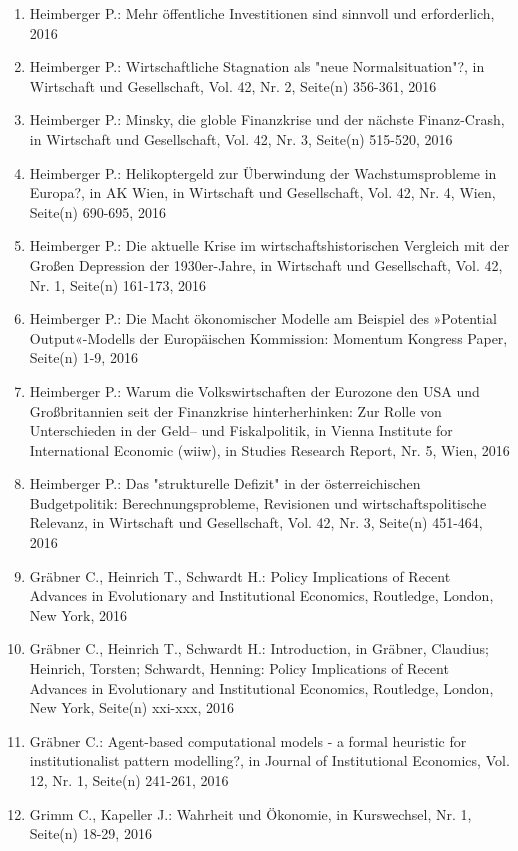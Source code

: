 \begin{enumerate}
	 \item Heimberger P.: Mehr öffentliche Investitionen sind sinnvoll und erforderlich, 2016
	 \item Heimberger P.: Wirtschaftliche Stagnation als "neue Normalsituation"?, in Wirtschaft und Gesellschaft, Vol. 42, Nr. 2, Seite(n) 356-361, 2016
	 \item Heimberger P.: Minsky, die globle Finanzkrise und der nächste Finanz-Crash, in Wirtschaft und Gesellschaft, Vol. 42, Nr. 3, Seite(n) 515-520, 2016
	 \item Heimberger P.: Helikoptergeld zur Überwindung der Wachstumsprobleme in Europa?, in AK Wien, in Wirtschaft und Gesellschaft, Vol. 42, Nr. 4, Wien, Seite(n) 690-695, 2016
	 \item Heimberger P.: Die aktuelle Krise im wirtschaftshistorischen Vergleich mit der Großen Depression der 1930er-Jahre, in Wirtschaft und Gesellschaft, Vol. 42, Nr. 1, Seite(n) 161-173, 2016
	 \item Heimberger P.: Die Macht ökonomischer Modelle am Beispiel des »Potential Output«-Modells der Europäischen Kommission: Momentum Kongress Paper, Seite(n) 1-9, 2016
	 \item Heimberger P.: Warum die Volkswirtschaften der Eurozone den USA und Großbritannien seit der Finanzkrise hinterherhinken: Zur Rolle von Unterschieden in der Geld– und Fiskalpolitik, in Vienna Institute for International Economic (wiiw), in Studies Research Report, Nr. 5, Wien, 2016
	 \item Heimberger P.: Das "strukturelle Defizit" in der österreichischen Budgetpolitik: Berechnungsprobleme, Revisionen und wirtschaftspolitische Relevanz, in Wirtschaft und Gesellschaft, Vol. 42, Nr. 3, Seite(n) 451-464, 2016
	 \item Gräbner C., Heinrich T., Schwardt H.: Policy Implications of Recent Advances in Evolutionary and Institutional Economics, Routledge, London, New York, 2016
	 \item Gräbner C., Heinrich T., Schwardt H.: Introduction, in Gräbner, Claudius; Heinrich, Torsten; Schwardt, Henning: Policy Implications of Recent Advances in Evolutionary and Institutional Economics, Routledge, London, New York, Seite(n) xxi-xxx, 2016
	 \item Gräbner C.: Agent-based computational models - a formal heuristic for institutionalist pattern modelling?, in Journal of Institutional Economics, Vol. 12, Nr. 1, Seite(n) 241-261, 2016
	 \item Grimm C., Kapeller J.: Wahrheit und Ökonomie, in Kurswechsel, Nr. 1, Seite(n) 18-29, 2016

\end{enumerate}
